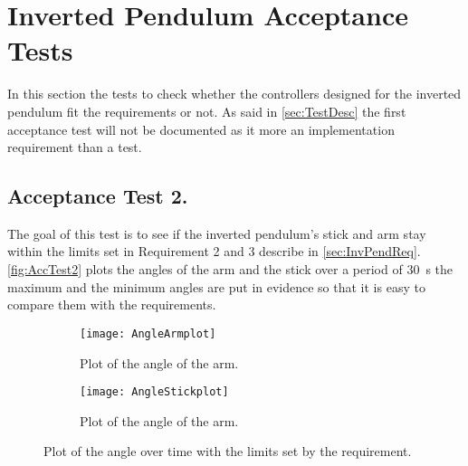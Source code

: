 \graphicspath{{figures/AcceptanceTest/}}

\section{Inverted Pendulum Acceptance Tests}\label{sec:InvPendAccTest}

In this section the tests to check whether the controllers designed for the inverted pendulum fit the requirements or not. As said in \autoref{sec:TestDesc} the first acceptance test will not be documented as it more an implementation requirement than a test.

\subsection{Acceptance Test 2.}

The goal of this test is to see if the inverted pendulum's stick and arm stay within the limits set in Requirement 2 and 3 describe in \autoref{sec:InvPendReq}. \autoref{fig:AccTest2} plots the angles of the arm and the stick over a period of \SI{30}{\second} the maximum and the minimum angles are put in evidence so that it is easy to compare them with the requirements.

\begin{figure}[htbp]
	\centering
	\begin{subfigure}{0.45\textwidth}
		\texttt{[image: AngleArmplot]}
		\caption{Plot of the angle of the arm.}
	\end{subfigure}
	\begin{subfigure}{0.45\textwidth}
		\texttt{[image: AngleStickplot]}
		\caption{Plot of the angle of the arm.}
	\end{subfigure}
	\caption{Plot of the angle over time with the limits set by the requirement.}
	\label{fig:AccTest2}
\end{figure}